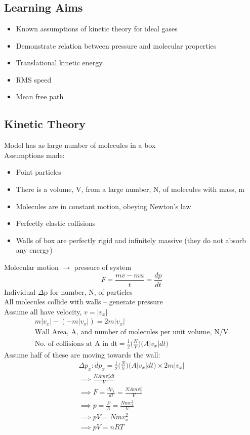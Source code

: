 \documentclass[a4paper, 11pt, fleqn, normalem]{report}
\begin{document}
\chapter{}
\thispagestyle{fancy}
\section{Learning Aims}
\begin{itemize}
	\item Known assumptions of kinetic theory for ideal gases
	\item Demonstrate relation between pressure and molecular properties
	\item Translational kinetic energy
	\item RMS speed
	\item Mean free path
\end{itemize}

\section{Kinetic Theory}
Model has as large number of molecules in a box \\
Assumptions made:
\begin{itemize}
	\item[] Point particles
	\item[] There is a volume, V, from a large number, N, of molecules with mass, m
	\item[] Molecules are in constant motion, obeying Newton's law
	\item[] Perfectly elastic collisions
	\item[] Walls of box are perfectly rigid and infinitely massive (they do not absorb any energy)
\end{itemize}
Molecular motion $\rightarrow$ pressure of system
\begin{equation*}
	F = \frac{mv-mu}{t} = \frac{dp}{dt}
\end{equation*}
Individual $\Delta$p for number, N, of particles \\
All molecules collide with walls -- generate pressure \\
Assume all have velocity, $v = |v_{x}|$
\begin{gather*}
	m|v_{x}| - (-m|v_{x}|) = 2m|v_{x}| \\
	\text{Wall Area, A, and number of molecules per unit volume, N/V} \\
	\text{No. of collisions at A in dt} = \frac{1}{2}\Big(\frac{N}{V}\Big)\big(A|v_{x}|dt\big)
\end{gather*}
Assume half of these are moving towards the wall:
\begin{gather*}
	{\Delta}p_{x}: dp_{x} = \frac{1}{2}\Big(\frac{N}{V}\Big)\big(A|v_{x}|dt\big) \times 2m|v_{x}| \\
	\implies \frac{NAmv^{2}_{x}dt}{V} \\
	\implies F = \frac{dp_{x}}{dt} = \frac{NAmv^{2}_{x}}{V} \\
	\implies p = \frac{F}{A} = \frac{Nmv^{2}_{x}}{V} \\
	\implies pV = Nmv^{2}_{x} \\
	\implies pV = nRT
\end{gather*}
\end{document}
